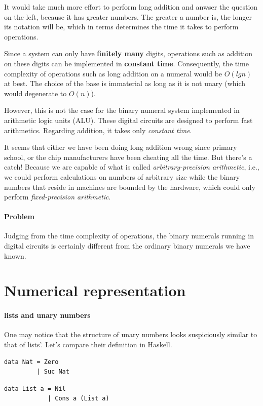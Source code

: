 \documentclass[\main/thesis.tex]{subfiles}
\begin{document}
It would take much more effort to perform long addition and anwser the question
on the left, because it has greater numbers. The greater a number is,
the longer its notation will be, which in terms determines the time it takes to
perform operations.

Since a system can only have \textbf{finitely many} digits, operations such as
addition on these digits can be implemented in \textbf{constant time}.
Consequently, the time complexity of operations such as long addition on a
numeral would be $ O(lg n) $ at best.
The choice of the base is immaterial as long as it is not unary
(which would degenerate to $ O(n) $).

However, this is not the case for the binary numeral system implemented in
arithmetic logic units (ALU). These digital circuits are designed to perform
fast arithmetics. Regarding addition, it takes only \textit{constant time}.

It seems that either we have been doing long addition wrong since primary school,
or the chip manufacturers have been cheating all the time. But there's a catch!
Because we are capable of what is called \textit{arbitrary-precision arithmetic},
i.e., we could perform calculations on numbers of arbitrary size
while the binary numbers that reside in machines are bounded by the hardware,
which could only perform \textit{fixed-precision arithmetic}.

\paragraph{Problem}
Judging from the time complexity of operations, the binary numerals running in
digital circuits is certainly different from the ordinary binary numerals we have
known.

\section{Numerical representation}

\paragraph{lists and unary numbers}

One may notice that the structure of unary numbers looks suspiciously similar
to that of lists'. Let's compare their definition in Haskell.

\noindent\begin{minipage}{.45\textwidth}
\begin{lstlisting}
data Nat = Zero
         | Suc Nat
\end{lstlisting}
\end{minipage}\hfill
\begin{minipage}{.48\textwidth}
\begin{lstlisting}
data List a = Nil
            | Cons a (List a)
\end{lstlisting}
\end{minipage}
\end{document}
